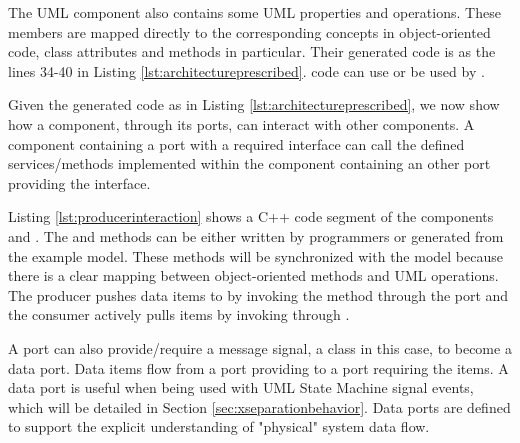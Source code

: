 \begin{minipage}{\columnwidth}
	
\end{minipage}


The UML  component also contains some UML properties and operations.
These members are mapped directly to the corresponding concepts in object-oriented code, class attributes and methods in particular.
Their generated code is  as the lines 34-40 in Listing \ref{lst:architectureprescribed}.
 code can use or be used by .

\vskip 0.1cm
\noindent
{} Given the generated code as in Listing \ref{lst:architectureprescribed}, we now show how a component, through its ports, can interact with other components.
A component containing a port with a required interface can call the defined services/methods implemented within the component containing an other port providing the interface.

\begin{minipage}{\columnwidth}
	
\end{minipage}

Listing \ref{lst:producerinteraction} shows a C++ code segment of the components  and .
The  and  methods can be either written by programmers or generated from the example model.
These methods will be synchronized with the model because there is a clear mapping between object-oriented methods and UML operations.
The producer pushes data items to  by invoking the  method through the  port and the consumer actively pulls items by invoking  through .


 
\vskip 0.1cm
\noindent
{} 
A port can also provide/require a message signal, a class in this case, to become a data port.
Data items flow from a port providing to a port requiring the items.
A data port is useful when being used with UML State Machine signal events, which will be detailed in Section \ref{sec:xseparationbehavior}.
Data ports are defined to support the explicit understanding of "physical" system data flow. 

